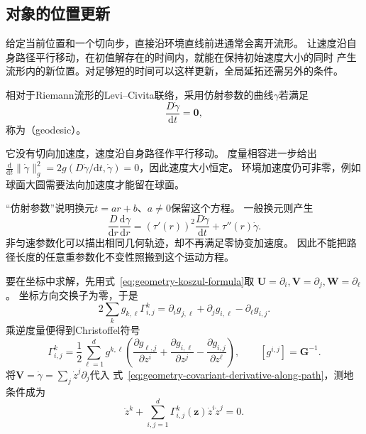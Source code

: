 \subsection{对象的位置更新}
\label{sec:geometry-position-updates}
\label{sec:geometry-geodesic-motion-minimization}

\label{sec:geometry-geodesic-motion}

给定当前位置和一个切向步，直接沿环境直线前进通常会离开流形。
让速度沿自身路径平行移动，在初值解存在的时间内，就能在保持初始速度大小的同时
产生流形内的新位置。对足够短的时间可以这样更新，全局延拓还需另外的条件。

\begin{definition}[测地线]
\label{def:geometry-geodesic}
相对于Riemann流形的Levi--Civita联络，采用仿射参数的曲线$\gamma$若满足
\[
 \frac{D\dot\gamma}{\mathrm dt}=\bm0,
\]
称为（geodesic）。
\end{definition}
它没有切向加速度，速度沿自身路径作平行移动。
度量相容进一步给出
$\frac{\mathrm d}{\mathrm dt}\lVert\dot\gamma\rVert_g^2
=2g(D\dot\gamma/\mathrm dt,\dot\gamma)=0$，因此速度大小恒定。
环境加速度仍可非零，例如球面大圆需要法向加速度才能留在球面。

“仿射参数”说明换元$t=ar+b$、$a\neq0$保留这个方程。
一般换元则产生
\[
 \frac{D}{\mathrm dr}\frac{\mathrm d\gamma}{\mathrm dr}
 =(\tau'(r))^2\frac{D\dot\gamma}{\mathrm dt}
   +\tau''(r)\dot\gamma.
\]
非匀速参数化可以描出相同几何轨迹，却不再满足零协变加速度。
因此不能把路径长度的任意重参数化不变性照搬到这个运动方程。

要在坐标中求解，先用式~\eqref{eq:geometry-koszul-formula}取
$\bm U=\partial_i,\bm V=\partial_j,\bm W=\partial_\ell$。
坐标方向交换子为零，于是
\[
 2\sum_k g_{k,\ell}\Gamma^k_{i,j}
 =\partial_i g_{j,\ell}+\partial_j g_{i,\ell}-\partial_\ell g_{i,j}.
\]
乘逆度量便得到Christoffel符号
\begin{equation}
 \Gamma^k_{i,j}
 =\frac12\sum_{\ell=1}^d g^{k,\ell}
  \left(\frac{\partial g_{\ell,j}}{\partial z^i}
       +\frac{\partial g_{i,\ell}}{\partial z^j}
       -\frac{\partial g_{i,j}}{\partial z^\ell}\right),
 \qquad [g^{i,j}]=\bm G^{-1}.
 \label{eq:geometry-christoffel-symbols}
\end{equation}
将$\bm V=\dot\gamma=\sum_j\dot z^j\partial_j$代入
式~\eqref{eq:geometry-covariant-derivative-along-path}，测地条件成为
\begin{equation}
 \ddot z^k+\sum_{i,j=1}^d
 \Gamma^k_{i,j}(\bm z)\dot z^i\dot z^j=0.
 \label{eq:geometry-geodesic-equation}
\end{equation}

